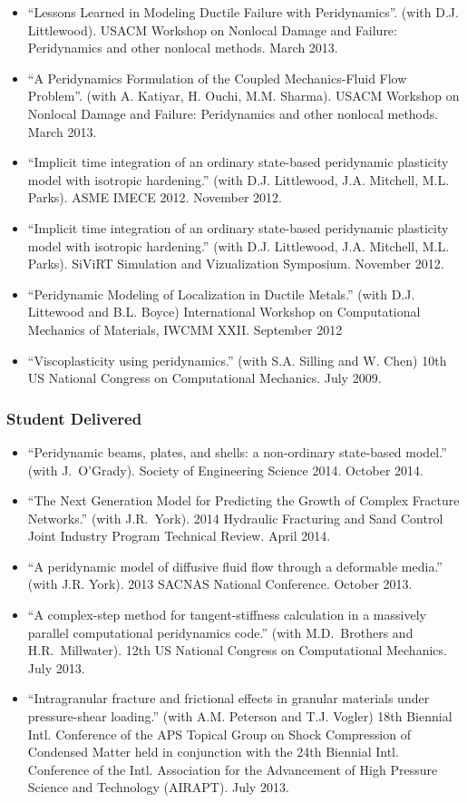 \begin{itemize}
    \item ``Lessons Learned in Modeling Ductile Failure with Peridynamics''. (with D.J. Littlewood). USACM Workshop on Nonlocal Damage and Failure: Peridynamics and other nonlocal methods. March 2013.
    \item ``A Peridynamics Formulation of the Coupled Mechanics-Fluid Flow Problem''. (with A. Katiyar, H. Ouchi, M.M. Sharma). USACM Workshop on Nonlocal Damage and Failure: Peridynamics and other nonlocal methods. March 2013.
    \item ``Implicit time integration of an ordinary state-based peridynamic plasticity model with isotropic hardening.'' (with D.J. Littlewood, J.A. Mitchell, M.L. Parks).  ASME IMECE 2012.  November 2012.
    \item ``Implicit time integration of an ordinary state-based peridynamic plasticity model with isotropic hardening.'' (with D.J. Littlewood, J.A. Mitchell, M.L. Parks).  SiViRT Simulation and Vizualization Symposium.  November 2012.
    \item ``Peridynamic Modeling of Localization in Ductile Metals.'' (with D.J. Littewood and B.L. Boyce)  International Workshop on Computational Mechanics of Materials,
IWCMM XXII. September 2012
    \item ``Viscoplasticity using peridynamics.''  (with S.A. Silling and W. Chen) 10th US National Congress on Computational Mechanics. July 2009.
\end{itemize}

\subsubsection*{Student Delivered}

\begin{itemize}
  \item ``Peridynamic beams, plates, and shells: a non-ordinary state-based model.'' (with J.~O'Grady). Society of Engineering Science 2014. October 2014.
  \item ``The Next Generation Model for Predicting the Growth of Complex Fracture Networks.'' (with J.R.~York). 2014 Hydraulic Fracturing and Sand Control Joint Industry Program Technical Review.  April 2014.
  \item ``A peridynamic model of diffusive fluid flow through a deformable media.'' (with J.R. York). 2013 SACNAS National Conference. October 2013.
  \item ``A complex-step method for tangent-stiffness calculation in a massively parallel computational peridynamics code.'' (with M.D.~Brothers and H.R.~Millwater). 12th US National Congress on Computational Mechanics. July 2013.
  \item ``Intragranular fracture and frictional effects in granular materials under pressure-shear loading.'' (with A.M. Peterson and T.J. Vogler) 18th Biennial Intl. Conference of the APS Topical Group on Shock Compression of Condensed Matter held in conjunction with the 24th Biennial Intl. Conference of the Intl. Association for the Advancement of High Pressure Science and Technology (AIRAPT). July 2013.
\end{itemize}


